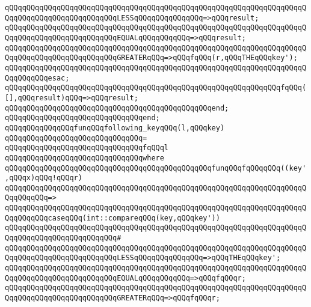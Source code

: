 \verb|qQQqqQQqqQQqqQQqqQQqqQQqqQQqqQQqqQQqqQQqqQQqqQQqqQQqqQQqqQQqqQQqqQQqqQQqqQQqqQQqqQQqqQQqqQQqqQQqLESSqQQqqQQqqQQqqQQq=>qQQqresult;|\newline
\verb|qQQqqQQqqQQqqQQqqQQqqQQqqQQqqQQqqQQqqQQqqQQqqQQqqQQqqQQqqQQqqQQqqQQqqQQqqQQqqQQqqQQqqQQqqQQqqQQqEQUALqQQqqQQqqQQq=>qQQqresult;|\newline
\verb|qQQqqQQqqQQqqQQqqQQqqQQqqQQqqQQqqQQqqQQqqQQqqQQqqQQqqQQqqQQqqQQqqQQqqQQqqQQqqQQqqQQqqQQqqQQqqQQqGREATERqQQq=>qQQqfqQQq(r,qQQqTHEqQQqkey');|\newline
\verb|qQQqqQQqqQQqqQQqqQQqqQQqqQQqqQQqqQQqqQQqqQQqqQQqqQQqqQQqqQQqqQQqqQQqqQQqqQQqqQQqesac;|\newline
\newline
\verb|qQQqqQQqqQQqqQQqqQQqqQQqqQQqqQQqqQQqqQQqqQQqqQQqqQQqqQQqqQQqqQQqfqQQq([],qQQqresult)qQQq=>qQQqresult;|\newline
\verb|qQQqqQQqqQQqqQQqqQQqqQQqqQQqqQQqqQQqqQQqqQQqqQQqend;|\newline
\verb|qQQqqQQqqQQqqQQqqQQqqQQqqQQqqQQqend;|\newline
\verb|qQQqqQQqqQQqqQQqfunqQQqfollowing_keyqQQq(l,qQQqkey)|\newline
\verb|qQQqqQQqqQQqqQQqqQQqqQQqqQQqqQQq=|\newline
\verb|qQQqqQQqqQQqqQQqqQQqqQQqqQQqqQQqfqQQql|\newline
\verb|qQQqqQQqqQQqqQQqqQQqqQQqqQQqqQQqwhere|\newline
\verb|qQQqqQQqqQQqqQQqqQQqqQQqqQQqqQQqqQQqqQQqqQQqqQQqfunqQQqfqQQqqQQq((key',qQQqx)qQQq!qQQqr)|\newline
\verb|qQQqqQQqqQQqqQQqqQQqqQQqqQQqqQQqqQQqqQQqqQQqqQQqqQQqqQQqqQQqqQQqqQQqqQQqqQQqqQQq=>|\newline
\verb|qQQqqQQqqQQqqQQqqQQqqQQqqQQqqQQqqQQqqQQqqQQqqQQqqQQqqQQqqQQqqQQqqQQqqQQqqQQqqQQqcaseqQQq(int::compareqQQq(key,qQQqkey'))|\newline
\verb|qQQqqQQqqQQqqQQqqQQqqQQqqQQqqQQqqQQqqQQqqQQqqQQqqQQqqQQqqQQqqQQqqQQqqQQqqQQqqQQqqQQqqQQqqQQqqQQq#|\newline
\verb|qQQqqQQqqQQqqQQqqQQqqQQqqQQqqQQqqQQqqQQqqQQqqQQqqQQqqQQqqQQqqQQqqQQqqQQqqQQqqQQqqQQqqQQqqQQqqQQqLESSqQQqqQQqqQQqqQQq=>qQQqTHEqQQqkey';|\newline
\verb|qQQqqQQqqQQqqQQqqQQqqQQqqQQqqQQqqQQqqQQqqQQqqQQqqQQqqQQqqQQqqQQqqQQqqQQqqQQqqQQqqQQqqQQqqQQqqQQqEQUALqQQqqQQqqQQq=>qQQqfqQQqr;|\newline
\verb|qQQqqQQqqQQqqQQqqQQqqQQqqQQqqQQqqQQqqQQqqQQqqQQqqQQqqQQqqQQqqQQqqQQqqQQqqQQqqQQqqQQqqQQqqQQqqQQqGREATERqQQq=>qQQqfqQQqr;|\newline
